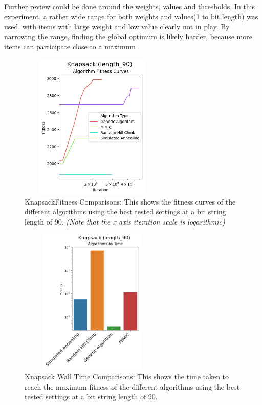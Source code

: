 \documentclass[letterpaper]{article} %
\begin{document}
Further review could be done around the weights, values and thresholds.  In this experiment,  a rather wide range for both weights and values(1 to bit length) was used, with items with large weight and low value clearly not in play.  By narrowing the range, finding the global optimum is likely harder, because more items can participate close to a maximum .

\begin{figure}[!htb]
\centering
\includegraphics[width=2.75in, height=2.75in]{figures/Knapsack_length_90_Algorithm_Fitness_Curves__log.png}
\caption{KnapsackFitness Comparisons: This shows the fitness curves of the different algorithms using the best tested settings at a bit string length of 90. \emph{(Note that the x axis iteration scale is logarithmic)} }
\label{fig:knapsack_fitness_comparison_90}
\end{figure}

\begin{figure}[!htb]
\centering
\includegraphics[width=2.75in, height=2.75in]{figures/Knapsack_length_90_Algorithms_by_Time_.png}
\caption{Knapsack Wall Time Comparisons: This shows the time taken to reach the maximum fitness of the different algorithms using the best tested settings at a bit string length of 90.  }
\label{fig:knapsack_walltime_comparison_90}
\end{figure}
\end{document}
